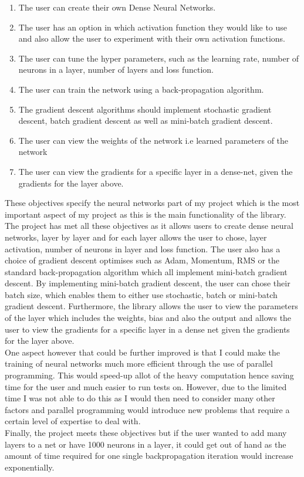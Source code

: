 \begin{enumerate}
    \addtocounter{enumi}{3}
    \item The user can create their own Dense Neural Networks.
    \item The user has an option in which activation function they would like to use and also allow the user to experiment with their own activation functions.
    \item The user can tune the hyper parameters, such as the learning rate, number of neurons in a layer, number of layers and loss function.
    \item The user can train the network using a back-propagation algorithm.
    \item The gradient descent algorithms should implement stochastic gradient descent, batch gradient descent as well as mini-batch gradient descent.
    \item The user can view the weights of the network i.e learned parameters of the network
    \item The user can view the gradients for a specific layer in a dense-net, given the gradients for the layer above.
\end{enumerate}

These objectives specify the neural networks part of my project which is the most important aspect of my project as this is the main functionality of the library. The project has met all these objectives as it allows users to create dense neural networks, layer by layer and for each layer allows the user to chose, layer activation, number of neurons in layer and loss function. The user also has a choice of gradient descent optimises such as Adam, Momentum, RMS or the standard back-propagation algorithm which all implement mini-batch gradient descent. By implementing mini-batch gradient descent, the user can chose their batch size, which enables them to either use stochastic, batch or mini-batch gradient descent. Furthermore, the library allows the user to view the parameters of the layer which includes the weights, bias and also the output and allows the user to view the gradients for a specific layer in a dense net given the gradients for the layer above. \\
One aspect however that could be further improved is that I could make the training of neural networks much more efficient through the use of parallel programming. This would speed-up allot of the heavy computation hence saving time for the user and much easier to run tests on. However, due to the limited time I was not able to do this as I would then need to consider many other factors and parallel programming would introduce new problems that require a certain level of expertise to deal with. 
\\
Finally, the project meets these objectives but if the user wanted to add many layers to a net or have 1000 neurons in a layer, it could get out of hand as the amount of time required for one single backpropagation iteration would increase exponentially.

